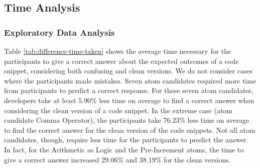 
\subsection{Time Analysis}

\subsubsection*{Exploratory Data Analysis}
Table \ref{tab:difference-time-taken} shows the average time necessary for the participants to give a correct answer about the expected outcomes of a code snippet, considering both confusing and clean versions. We do not consider cases where the participants made mistakes. Seven atom candidates required more time from participants to predict a correct response. For these seven atom candidates, developers take at least 5.90\% less time on average to find a correct answer when considering the clean version of a code snippet. In the extreme case (atom candidate Comma Operator), the participants take 76.23\% less
time on average to find the correct answer for the clean version of the code snippets. 
Not all atom candidates, though, require less time for the participants to predict the answer. In fact, for the Arithmetic as Logic and the Pre-Increment atoms, the time to give a correct answer increased  
29.06\% and 38.19\% for the clean versions.

